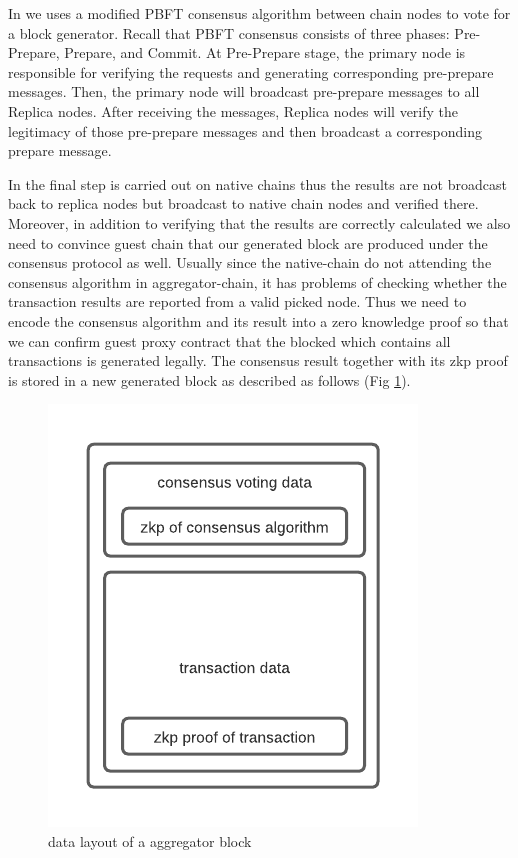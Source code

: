\documentclass[pageno]{jpaper}
\begin{document}
In \dprotocol we uses a modified PBFT \cite{castro1999practical} consensus algorithm between chain nodes to vote for a block generator. Recall that PBFT consensus consists of three phases: Pre-Prepare, Prepare, and Commit. At Pre-Prepare stage, the primary node is responsible for verifying the requests and generating corresponding pre-prepare messages. Then, the primary node will broadcast pre-prepare messages to all Replica nodes. After receiving the messages, Replica nodes will verify the legitimacy of those pre-prepare messages and then broadcast a corresponding prepare message.

In \dprotocol the final step is carried out on native chains thus the results are not broadcast back to replica nodes but broadcast to native chain nodes and verified there. Moreover, in addition to verifying that the results are correctly calculated we also need to convince guest chain that our generated block are produced under the consensus protocol as well. Usually since the native-chain do not attending the consensus algorithm in aggregator-chain, it has problems of checking whether the transaction results are reported from a valid picked node. Thus we need to encode the consensus algorithm and its result into a zero knowledge proof so that we can confirm guest proxy contract that the blocked which contains all transactions is generated legally. The consensus result together with its zkp proof is stored in a new generated block as described as follows (Fig \ref{block-layout}). 

\begin{figure}[!ht]
\begin{center}
\includegraphics[scale=0.5]{block-data-layout}
\end{center}
\caption{data layout of a aggregator block}
\label{block-layout}
\end{figure}
\end{document}
